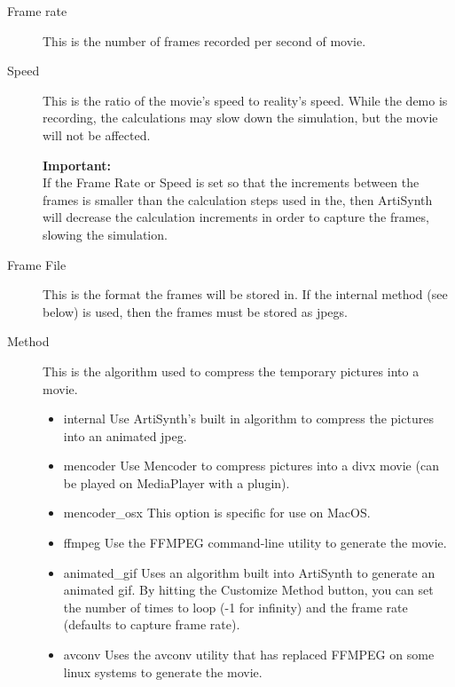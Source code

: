 \documentclass{article}
\begin{document}
\begin{description}

\item[Frame rate]\mbox{}

This is the number of frames recorded per second of movie.

\item[Speed]\mbox{}

This is the ratio of the movie's speed to reality's speed. While the
demo is recording, the calculations may slow down the simulation, but
the movie will not be affected.

\begin{sideblock}
{\bf Important:}\\
If the {\sf Frame Rate} or {\sf Speed} is set so that the
increments between the frames is smaller than the calculation steps
used in the, then ArtiSynth will decrease the calculation increments
in order to capture the frames, slowing the simulation.
\end{sideblock}

\item[Frame File]\mbox{}

This is the format the frames will be stored in. If the internal
method (see below) is used, then the frames must be stored as jpegs.

\item[Method]\mbox{}

This is the algorithm used to compress the temporary pictures into a movie.

\begin{itemize}

\item {\sf internal} Use ArtiSynth's built in algorithm to compress the
pictures into an animated jpeg.

\item {\sf mencoder} Use Mencoder to compress pictures into a divx movie
(can be played on MediaPlayer with a plugin).

\item {\sf mencoder\_osx} This option is specific for use on MacOS.

\item {\sf ffmpeg} Use the FFMPEG command-line utility to generate
the movie.

\item {\sf animated\_gif} Uses an algorithm built into ArtiSynth to
generate an animated gif.  By hitting the {\sf Customize Method}
button, you can set the number of times to loop (-1 for infinity)
and the frame rate (defaults to capture frame rate).

\item {\sf avconv} Uses the avconv utility that has replaced
FFMPEG on some linux systems to generate the movie.

\end{itemize}

\end{description}
\end{document}
